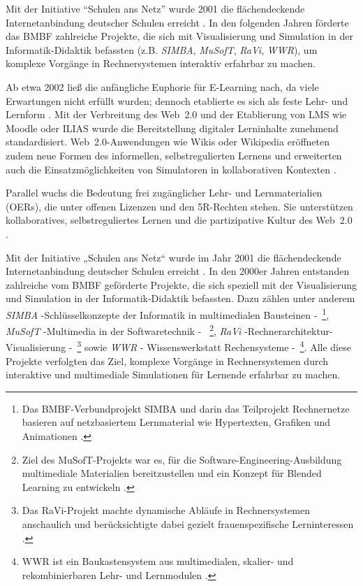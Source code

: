 Mit der Initiative \enquote{Schulen ans Netz} wurde 2001 die flächendeckende Internetanbindung deutscher Schulen erreicht \parencite{schulen_ans_netz_ev_schulen_nodate,kopcke_internet_2016}. In den folgenden Jahren förderte das \ac{BMBF} zahlreiche Projekte, die sich mit Visualisierung und Simulation in der Informatik-Didaktik befassten (z.B. \textit{SIMBA}, \textit{MuSofT}, \textit{RaVi}, \textit{WWR}), um komplexe Vorgänge in Rechnersystemen interaktiv erfahrbar zu machen. 

Ab etwa 2002 ließ die anfängliche Euphorie für E-Learning nach, da viele Erwartungen nicht erfüllt wurden; dennoch etablierte es sich als feste Lehr- und Lernform \parencite[S.~14]{niegemann_kompendium_2008}. Mit der Verbreitung des Web~2.0 und der Etablierung von \ac{LMS} wie Moodle oder ILIAS wurde die Bereitstellung digitaler Lerninhalte zunehmend standardisiert. Web~2.0-Anwendungen wie Wikis oder Wikipedia eröffneten zudem neue Formen des informellen, selbstregulierten Lernens und erweiterten auch die Einsatzmöglichkeiten von Simulatoren in kollaborativen Kontexten \parencite[S.~129f]{gallagher_assessing_2007}. 

Parallel wuchs die Bedeutung frei zugänglicher Lehr- und Lernmaterialien (\acp{OER}), die unter offenen Lizenzen und den 5R-Rechten stehen. Sie unterstützen kollaboratives, selbstreguliertes Lernen und die partizipative Kultur des Web~2.0 \parencites[S.~1]{unesco_guidelines_2011}[S.~194f]{fluhler_open_2024}.


\iffalse
Mit der Initiative „Schulen ans Netz“ \cite{schulen_ans_netz_ev_schulen_nodate} wurde im Jahr 2001 die flächendeckende Internetanbindung deutscher Schulen erreicht \cite{kopcke_internet_2016}. In den 2000er Jahren entstanden zahlreiche vom \ac{BMBF} geförderte Projekte, die sich speziell mit der Visualisierung und Simulation in der Informatik-Didaktik befassten. Dazu zählen unter anderem \textit{SIMBA} -Schlüsselkonzepte der Informatik in multimedialen Bausteinen -~\footnote{Das \ac{BMBF}-Verbundprojekt SIMBA und darin das Teilprojekt Rechnernetze basieren auf netzbasiertem Lernmaterial wie Hypertexten, Grafiken und Animationen \parencite[S.~75]{magenheim_blended_2003}.}, \textit{MuSofT} -Multimedia in der Softwaretechnik -~ \footnote{Ziel des MuSofT-Projekts war es, für die Software-Engineering-Ausbildung multimediale Materialien bereitzustellen und ein Konzept für Blended Learning zu entwickeln \parencite[S.~73]{magenheim_blended_2003}.}, \textit{RaVi} -Rechnerarchitektur-Visualisierung -~\footnote{Das RaVi-Projekt machte dynamische Abläufe in Rechnersystemen anschaulich und berücksichtigte dabei gezielt frauenspezifische Lerninteressen \parencite[S.~20]{marwedel_interaktive_2003}.} sowie \textit{WWR} - Wissenswerkstatt Rechensysteme -~\footnote{WWR ist ein Baukastensystem aus multimedialen, skalier- und rekombinierbaren Lehr- und Lernmodulen \parencite[S.~1]{kornelsen_inhalte_2004}.}. Alle diese Projekte verfolgten das Ziel, komplexe Vorgänge in Rechnersystemen durch interaktive und multimediale Simulationen für Lernende erfahrbar zu machen.

